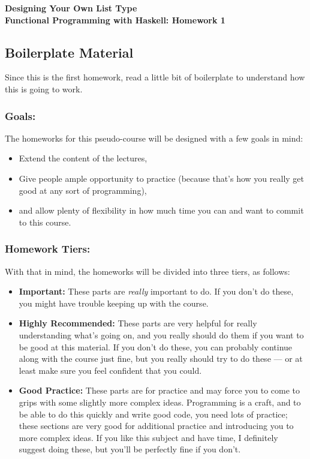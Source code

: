 \documentclass{article}
\begin{document}
\begin{center}
    \bf 
    {\Large Designing Your Own List Type} \\[1em]
    {\large Functional Programming with Haskell: Homework 1}
\end{center}

\subsection*{Boilerplate Material}

Since this is the first homework, read a little bit of boilerplate to understand how this is going
to work.

\subsubsection*{Goals:}

The homeworks for this pseudo-course will be designed with a few goals in mind:
\begin{itemize}
    \item Extend the content of the lectures,
    \item Give people ample opportunity to practice (because that's how you really get good at any
        sort of programming),
    \item and allow plenty of flexibility in how much time you can and want to commit to this
        course.
\end{itemize}

\subsubsection*{Homework Tiers:}

With that in mind, the homeworks will be divided into three tiers, as follows:
\begin{itemize}
    \item \textbf{Important:}
        These parts are \emph{really} important to do. If you don't do these, you might have trouble
        keeping up with the course.
    \item \textbf{Highly Recommended:}
        These parts are very helpful for really understanding what's going on, and you really should
        do them if you want to be good at this material. If you don't do these, you can probably
        continue along with the course just fine, but you really should try to do these --- or at
        least make sure you feel confident that you could.
    \item \textbf{Good Practice:}
        These parts are for practice and may force you to come to grips with some slightly more
        complex ideas. Programming is a craft, and to be able to do this quickly and write good
        code, you need lots of practice; these sections are very good for additional practice and
        introducing you to more complex ideas. If you like this subject and have time, I definitely
        suggest doing these, but you'll be perfectly fine if you don't.
\end{itemize}
\end{document}
